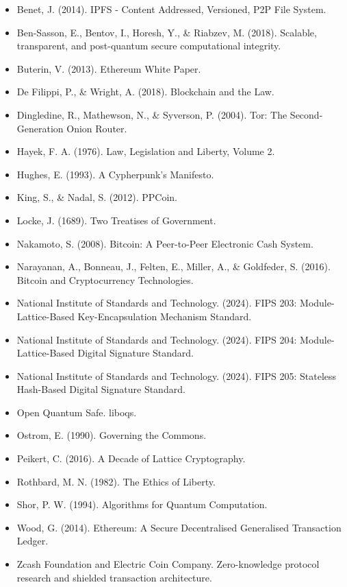 ﻿\documentclass[12pt]{article}
\begin{document}
\begin{itemize}
  \item Benet, J. (2014). IPFS - Content Addressed, Versioned, P2P File System.
  \item Ben-Sasson, E., Bentov, I., Horesh, Y., \& Riabzev, M. (2018). Scalable, transparent, and post-quantum secure computational integrity.
  \item Buterin, V. (2013). Ethereum White Paper.
  \item De Filippi, P., \& Wright, A. (2018). Blockchain and the Law.
  \item Dingledine, R., Mathewson, N., \& Syverson, P. (2004). Tor: The Second-Generation Onion Router.
  \item Hayek, F. A. (1976). Law, Legislation and Liberty, Volume 2.
  \item Hughes, E. (1993). A Cypherpunk's Manifesto.
  \item King, S., \& Nadal, S. (2012). PPCoin.
  \item Locke, J. (1689). Two Treatises of Government.
  \item Nakamoto, S. (2008). Bitcoin: A Peer-to-Peer Electronic Cash System.
  \item Narayanan, A., Bonneau, J., Felten, E., Miller, A., \& Goldfeder, S. (2016). Bitcoin and Cryptocurrency Technologies.
  \item National Institute of Standards and Technology. (2024). FIPS 203: Module-Lattice-Based Key-Encapsulation Mechanism Standard.
  \item National Institute of Standards and Technology. (2024). FIPS 204: Module-Lattice-Based Digital Signature Standard.
  \item National Institute of Standards and Technology. (2024). FIPS 205: Stateless Hash-Based Digital Signature Standard.
  \item Open Quantum Safe. liboqs.
  \item Ostrom, E. (1990). Governing the Commons.
  \item Peikert, C. (2016). A Decade of Lattice Cryptography.
  \item Rothbard, M. N. (1982). The Ethics of Liberty.
  \item Shor, P. W. (1994). Algorithms for Quantum Computation.
  \item Wood, G. (2014). Ethereum: A Secure Decentralised Generalised Transaction Ledger.
  \item Zcash Foundation and Electric Coin Company. Zero-knowledge protocol research and shielded transaction architecture.
\end{itemize}
\end{document}
